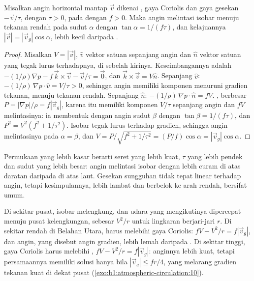 \begin{proposition}\label{prop:b1:atmospheric-circulation:friction}
Misalkan angin horizontal mantap $\vec v$ dikenai ,
gaya Coriolis dan gaya gesekan $-\vec v/\tau$, dengan $\tau > 0$, pada 
dengan $f > 0$. Maka angin melintasi isobar menuju tekanan rendah pada sudut $\alpha$
dengan $\tan\alpha = 1/(f\tau)$, dan kelajuannya $|\vec v| =
|\vec v_g|\cos\alpha$, lebih kecil daripada .
\end{proposition}

\begin{proof}
Misalkan $V = |\vec v|$, $\hat v$ vektor satuan sepanjang angin dan $\hat n$ vektor
satuan yang tegak lurus terhadapnya, di sebelah kirinya. Keseimbangannya adalah $-(1/\rho)\nabla p - f\,
\vec k\times\vec v - \vec v/\tau = \vec 0$, dan $\vec k\times\vec v = V\hat n$.
Sepanjang $\hat v$: $-(1/\rho)\,\nabla p\cdot\hat v = V/\tau > 0$, sehingga angin memiliki
komponen menuruni gradien tekanan, menuju tekanan rendah. Sepanjang $\hat n$:
$-(1/\rho)\,\nabla p\cdot\hat n = fV$. , berbesar $P =
|\nabla p|/\rho = f|\vec v_g|$, karena itu memiliki komponen $V/\tau$ sepanjang angin dan
$fV$ melintasinya: ia membentuk dengan angin sudut $\beta$ dengan $\tan\beta =
1/(f\tau)$, dan $P^2 = V^2(f^2 + 1/\tau^2)$. Isobar tegak lurus terhadap gradien, sehingga angin
melintasinya pada $\alpha = \beta$, dan $V = P/\sqrt{f^2 +
1/\tau^2} = (P/f)\cos\alpha = |\vec v_g|\cos\alpha$.
\end{proof}

Permukaan yang lebih kasar berarti seret yang lebih kuat, $\tau$ yang lebih pendek dan sudut yang lebih besar: angin melintasi isobar dengan lebih curam di atas daratan daripada di atas laut. Gesekan sungguhan tidak tepat linear terhadap angin, tetapi kesimpulannya, lebih lambat dan berbelok ke arah rendah, bersifat umum.

\begin{remark}\label{rem:b1:atmospheric-circulation:gradient}
Di sekitar pusat, isobar melengkung, dan udara yang mengikutinya dipercepat menuju pusat kelengkungan, sebesar $V^2/r$ untuk lingkaran berjari-jari $r$. Di sekitar rendah di Belahan Utara,  harus melebihi gaya Coriolis: $fV + V^2/r = f|\vec v_g|$, dan angin, yang disebut angin gradien, lebih lemah daripada . Di sekitar tinggi, gaya Coriolis harus melebihi , $fV - V^2/r = f|\vec v_g|$: anginnya lebih kuat, tetapi persamaannya memiliki solusi hanya bila $|\vec v_g| \leq fr/4$, yang melarang gradien tekanan kuat di dekat pusat  (\cref{exo:b1:atmospheric-circulation:10}).
\end{remark}

